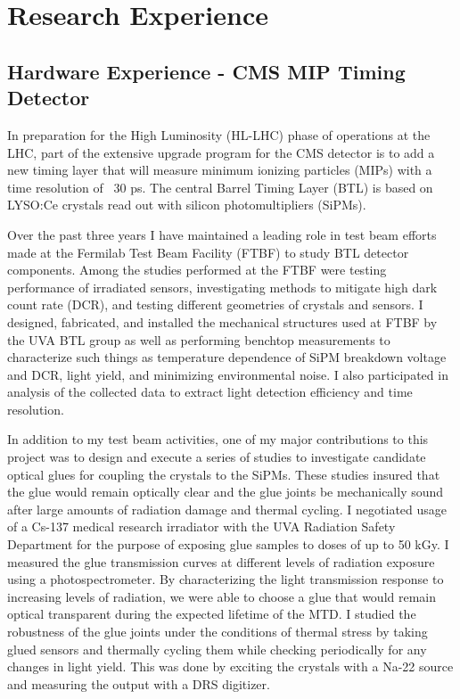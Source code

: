 \documentclass[10pt,a4paper,sans,english]{moderncv}        %
\begin{document}
\section{Research Experience}



\subsection{Hardware Experience - CMS MIP Timing Detector}
In preparation for the High Luminosity (HL-LHC) phase of operations at the LHC, part of the extensive upgrade program for the CMS detector is to add a new timing layer that will measure minimum ionizing particles (MIPs) with a time resolution of ~30 ps.  The central Barrel Timing Layer (BTL) is based on LYSO:Ce crystals read out with silicon photomultipliers (SiPMs).  

Over the past three years I have maintained a leading role in test beam efforts made at the Fermilab Test Beam Facility (FTBF) to study BTL detector components.  Among the studies performed at the FTBF were testing performance of irradiated sensors, investigating methods to mitigate high dark count rate (DCR), and testing different geometries of crystals and sensors.  I designed, fabricated, and installed the mechanical structures used at FTBF by the UVA BTL group as well as performing benchtop measurements to characterize such things as temperature dependence of SiPM breakdown voltage and DCR, light yield, and minimizing environmental noise.  I also participated in analysis of the collected data to extract light detection efficiency and time resolution.

In addition to my test beam activities, one of my major contributions to this project was to design and execute a series of studies to investigate candidate optical glues for coupling the crystals to the SiPMs.  These studies insured that the glue would remain optically clear and the glue joints be mechanically sound after large amounts of radiation damage and thermal cycling.  I negotiated usage of a Cs-137 medical research irradiator with the UVA Radiation Safety Department for the purpose of exposing glue samples to doses of up to 50 kGy.  I measured the glue transmission curves at different levels of radiation exposure using a photospectrometer.  By characterizing the light transmission response to increasing levels of radiation, we were able to choose a glue that would remain optical transparent during the expected lifetime of the MTD.  I studied the robustness of the glue joints under the conditions of thermal stress by taking glued sensors and thermally cycling them while checking periodically for any changes in light yield.  This was done by exciting the crystals with a Na-22 source and measuring the output with a DRS digitizer.
\end{document}
